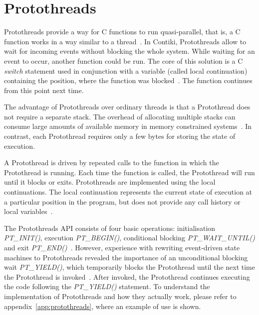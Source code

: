 
\section{Protothreads}\label{sec:contiki-protothreads}
Protothreads provide a way for C functions to run quasi-parallel,
that is, a C function works in a way similar to a thread~\cite{paper-protothreads}.
In Contiki, Protothreads allow to wait for incoming events without blocking the whole system.
While waiting for an event to occur, another function could be run.
The core of this solution is a C {\it switch} statement used in conjunction with a variable (called local continuation)
containing the position, where the function was blocked~\cite{paper-protothreads}.
The function continues from this point next time.

The advantage of Protothreads over ordinary threads is that a Protothread does not require a separate stack.
The overhead of allocating multiple stacks can consume large amounts of
available memory in memory constrained systems~\cite{paper-protothreads}.
In contrast, each Protothread requires only a few bytes for storing the state of execution.

A Protothread is driven by repeated calls to the function in which the Protothread is running.
Each time the function is called, the Protothread will run until it blocks or exits.
Protothreads are implemented using the local continuations. The local continuation represents the current state
of execution at a particular position in the program, but does not provide any call history or local variables~\cite{contiki-docs}.

The Protothreads API consists of four basic operations: initialisation {\it{PT\_INIT()}}, execution {\it{PT\_BEGIN()}},
conditional blocking {\it{PT\_WAIT\_UNTIL()}} and exit {\it{PT\_END()}}~\cite{paper-protothreads}.
However, experience with rewriting event-driven state machines to Protothreads revealed
the importance of an unconditional blocking wait {\it{PT\_YIELD()}},
which temporarily blocks the Protothread until the next time the Protothread is invoked~\cite{thesis-programming}.
After invoked, the Protothread continues executing the code following the {\it{PT\_YIELD()}} statement.
To understand the implementation of Protothreads and how they actually work,
please refer to appendix~\ref{app:protothreads}, where an example of use is shown.

